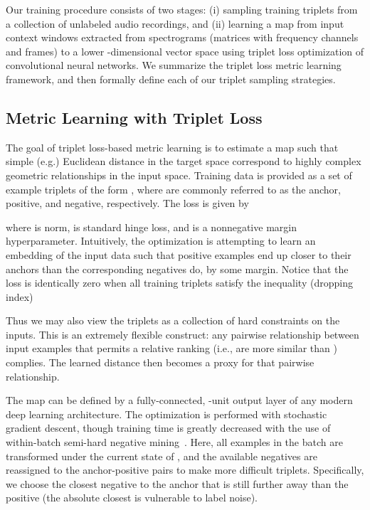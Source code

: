 \documentclass{article}
\begin{document}
Our training procedure consists of two stages: (i) sampling training triplets
from a collection of unlabeled audio recordings, and (ii) learning a map from
input context windows extracted from spectrograms (matrices with 
frequency channels and  frames) to a lower -dimensional vector space using
triplet loss optimization of convolutional neural networks. We summarize the
triplet loss metric learning framework, and then formally define each of our
triplet sampling strategies.

\subsection{Metric Learning with Triplet Loss}

The goal of triplet loss-based metric learning is to estimate a map  such that simple (e.g.)
Euclidean distance in the target space correspond to highly complex geometric
relationships in the input space.  Training data is provided as a set
 of example triplets of the form
, where  are commonly referred to as the anchor,
  positive, and negative, respectively. The loss is given by



\noindent
where  is  norm,  is standard hinge loss, and
 is a nonnegative margin hyperparameter.  Intuitively, the optimization
is attempting to learn an embedding of the input data such that positive
examples end up closer to their anchors than the corresponding negatives do, by
some margin.  Notice that the loss is identically zero when all training
triplets satisfy the inequality (dropping index)



\noindent
Thus we may also view the triplets as a collection of hard constraints on the
inputs.  This is an extremely flexible construct: any pairwise relationship
between input examples that permits a relative ranking (i.e.,  are
more similar than ) complies.  The learned distance then becomes a
proxy for that pairwise relationship.

The map  can be defined by a fully-connected, -unit output layer of any
modern deep learning architecture.  The optimization is performed with
stochastic gradient descent, though training time is greatly decreased with the
use of within-batch semi-hard negative mining~\cite{schroff2015facenet}.  Here,
all examples in the batch are transformed under the current state of , and
the available negatives are reassigned to the anchor-positive pairs to make more
difficult triplets.  Specifically, we choose the closest negative to the anchor
that is still further away than the positive (the absolute closest is vulnerable
to label noise).
\end{document}
